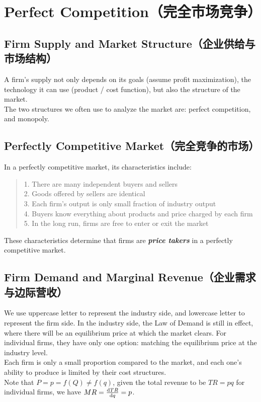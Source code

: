 \section{Perfect Competition（完全市场竞争）}
\subsection{Firm Supply and Market Structure（企业供给与市场结构）}
A firm's supply not only depends on its goals (assume profit maximization), the technology it can use (product / cost function), but also the structure of the market. \\
The two structures we often use to analyze the market are: perfect competition, and monopoly.

\subsection{Perfectly Competitive Market（完全竞争的市场）}
In a perfectly competitive market, its characteristics include:
\begin{quote}
    1. There are many independent buyers and sellers \\
    2. Goods offered by sellers are identical \\
    3. Each firm's output is only small fraction of industry output \\
    4. Buyers know everything about products and price charged by each firm \\
    5. In the long run, firms are free to enter or exit the market
\end{quote}
These characteristics determine that firms are \textbf{\textit{price takers}} in a perfectly competitive market.

\subsection{Firm Demand and Marginal Revenue（企业需求与边际营收）}
We use uppercase letter to represent the industry side, and lowercase letter to represent the firm side. In the industry side, the Law of Demand is still in effect, where there will be an equilibrium price at which the market clears. For individual firms, they have only one option: matching the equilibrium price at the industry level. \\
Each firm is only a small proportion compared to the market, and each one's ability to produce is limited by their cost structures. \\
Note that $P = p = f(Q) \ne f(q)$, given the total revenue to be $TR = pq$ for individual firms, we have $MR = \dv{TR}{q} = p$.

